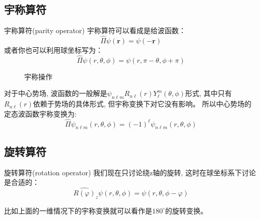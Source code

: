 \documentclass[a4paper,zihao=-4,linespread=1]{ctexrep}
\begin{document}
    \subsection*{宇称算符}
    \begin{define}{宇称算符(parity operator)}
        宇称算符可以看成是给波函数：
        \begin{equation}
            \boxed{\hat \Pi\psi(\mathbf{r})=\psi(-\mathbf{r})}
        \end{equation}
        或者你也可以利用球坐标写为：
        \begin{equation}
            \hat \Pi\psi(r,\theta,\phi)=\psi(r,\pi-\theta,\phi+\pi)
        \end{equation}
    \end{define}
    \begin{figure}[htbp]
        \centering
        \caption{宇称操作}
    \end{figure}
    对于中心势场, 波函数的一般解是$\psi_{n\ell m}R_{n\ell}(r)Y_\ell^m(\theta,\phi)$形式, 其中只有$R_{n\ell}(r)$依赖于势场的具体形式, 但宇称变换下对它没有影响。
    所以中心势场的定态波函数宇称变换为:$$\hat\Pi\psi_{n\ell m}(r,\theta,\phi)=(-1)^{\ell}\psi_{n\ell m}(r,\theta,\phi)$$
    
    \subsection*{旋转算符}
    \begin{define}{旋转算符(rotation operator)}
        我们现在只讨论绕z轴的旋转, 这时在球坐标系下讨论是合适的：
        \begin{equation}
            \label{eq:6.4}
            \boxed{\hat{R(\varphi)}_z\psi(r,\theta,\phi)=\psi(r,\theta,\phi-\varphi)}
        \end{equation}
    \end{define}
    比如上面的一维情况下的宇称变换就可以看作是$180^\circ$的旋转变换。
    
\end{document}
